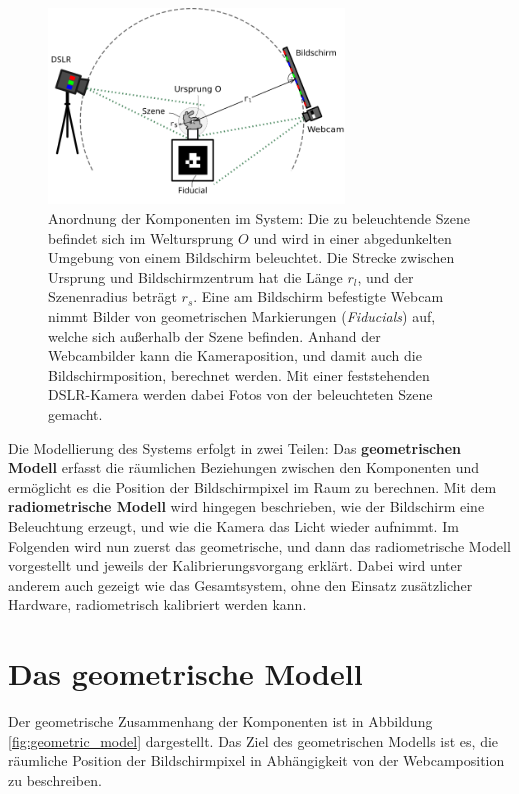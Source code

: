     \begin{figure}[h]
    \centering
    \includegraphics[width=0.7\textwidth]{../graphics/kalibrierung/setup.svg}
    \caption[Anordnung der Komponenten im System]{
    Anordnung der Komponenten im System:
  Die zu beleuchtende Szene befindet sich im Weltursprung $O$ und wird in einer abgedunkelten Umgebung von einem Bildschirm beleuchtet. 
  Die Strecke zwischen Ursprung und Bildschirmzentrum hat die Länge $r_l$, und der Szenenradius beträgt $r_s$.
  Eine am Bildschirm befestigte Webcam nimmt Bilder von geometrischen Markierungen (\emph{Fiducials}) auf, welche sich außerhalb der Szene befinden.
  Anhand der Webcambilder kann die Kameraposition, und damit auch die Bildschirmposition, berechnet werden.
  Mit einer feststehenden DSLR-Kamera werden dabei Fotos von der beleuchteten Szene gemacht.
  }
    \label{fig:setup}
   \end{figure}
 
  Die Modellierung des Systems erfolgt in zwei Teilen:
  Das \textbf{geometrischen Modell} erfasst die räumlichen Beziehungen zwischen den Komponenten und ermöglicht es die Position der Bildschirmpixel im Raum zu berechnen.
  Mit dem \textbf{radiometrische Modell} wird hingegen beschrieben, wie der Bildschirm eine Beleuchtung erzeugt, und wie die Kamera das Licht wieder aufnimmt.  
  Im Folgenden wird nun zuerst das geometrische, und dann das radiometrische Modell vorgestellt und jeweils der Kalibrierungsvorgang erklärt.
  Dabei wird unter anderem auch gezeigt wie das Gesamtsystem, ohne den Einsatz zusätzlicher Hardware, radiometrisch kalibriert werden kann.
 
 \section{Das geometrische Modell} \label{geometrisches_modell}
   
   Der geometrische Zusammenhang der Komponenten ist in Abbildung \ref{fig:geometric_model} dargestellt.
   Das Ziel des geometrischen Modells ist es, die räumliche Position der Bildschirmpixel in Abhängigkeit von der Webcamposition zu beschreiben.

